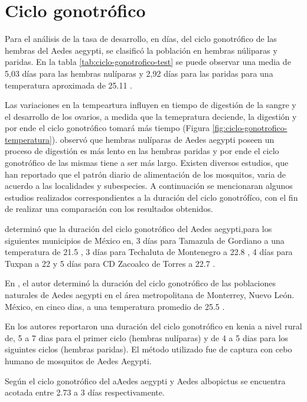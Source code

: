 
\section{Ciclo gonotrófico}

Para el análisis de la tasa de desarrollo, en días, del ciclo gonotrófico de las hembras del Aedes
aegypti, se clasificó la población en hembras núliparas y paridas. En la tabla
\ref{tab:ciclo-gonotrofico-test} se puede observar una media de 5,03 días para las hembras
nulíparas y  2,92 días para las paridas para una temperatura aproximada de 25.11 \textcelsius.

Las variaciones en la tempeartura influyen en tiempo de digestión de la sangre y el
desarrollo de los ovarios, a medida que la temepratura deciende, la digestión y por ende el ciclo
gonotrófico tomará más tiempo (Figura \ref{fig:ciclo-gonotrofico-temperatura}).
\cite{edman1987host} observó que hembras nulíparas de Aedes aegypti poseen un proceso de digestión
es más lento en las hembras paridas y por ende el ciclo gonotrófico de las mismas tiene a ser más
largo. Existen diversos estudios, que han reportado que el patrón diario de alimentación de los
mosquitos, varia de acuerdo a las localidades y subespecies. A continuación se mencionaran algunos
estudios realizados correspondientes a la duración del ciclo  gonotrófíco, con el fin de realizar
una comparación con los resultados obtenidos.

\cite{beltran2001bionomia} determinó que la duración del ciclo gonotrófico del Aedes aegypti,para
los siguientes municipios de México en, 3 días para Tamazula de Gordiano a una temperatura de 21.5
\textcelsius, 3 días para Techaluta de Montenegro a  22.8 \textcelsius, 4 días para Tuxpan a 22
\textcelsius y 5 días para CD Zacoalco de Torres a 22.7 \textcelsius.

En \cite{luevano1993ciclo}, el autor determinó la duración del ciclo gonotrófico de las
poblaciones naturales de Aedes aegypti en el área metropolitana de Monterrey, Nuevo León. México,
en cinco dias, a una temperatura promedio de 25.5 \textcelsius.

En \cite{trpis1986dispersal} los autores reportaron una duración del ciclo gonotrófico en kenia a
nivel rural de, 5 a 7 dias para el primer ciclo (hembras nulíparas) y de 4 a 5 dias para los
siguintes ciclos (hembras paridas). El método utilizado fue de captura con cebo humano de
mosquitos de Aedes Aegypti.

Según \cite{sivanathan2006ecology} el ciclo gonotrófico del aAedes aegypti y Aedes albopictus se
encuentra acotada entre 2.73 a 3 días respectivamente.

